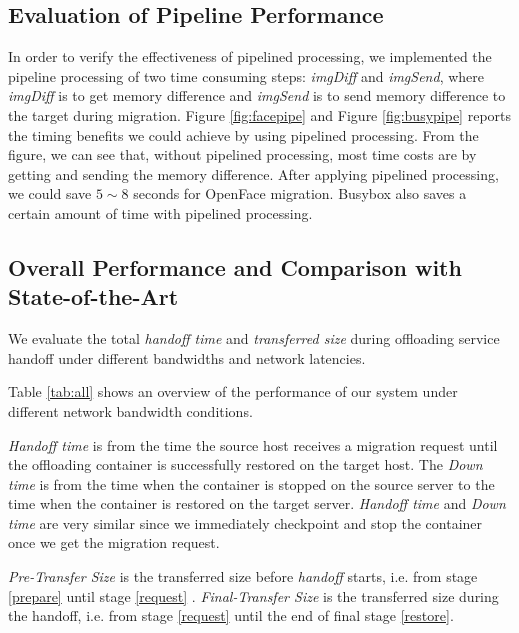 \subsection{Evaluation of Pipeline Performance}


In order to verify the effectiveness of pipelined processing, we implemented the pipeline processing of two time consuming steps: \textit{imgDiff} and \textit{imgSend}, where \textit{imgDiff} is to get memory difference and \textit{imgSend} is to send memory difference to the target during migration. 
Figure \ref{fig:facepipe} and Figure \ref{fig:busypipe} reports the timing benefits we could achieve by using pipelined processing. From the figure, we can see that, without pipelined processing, most time costs are by getting and sending the memory difference. After applying pipelined processing, we could save $5\sim 8$ seconds for OpenFace migration. Busybox also saves a certain amount of time with pipelined processing.


\subsection{Overall Performance and Comparison with State-of-the-Art}
We evaluate the total \textit{handoff time} and \textit{transferred size } during offloading service handoff under different bandwidths and network latencies. 

Table \ref{tab:all} shows an overview of the performance of our system under different network bandwidth conditions.
% 




\textit{Handoff time}
is from the time the source host receives a migration request until the offloading container is successfully restored on the target host. The \textit{Down time} is from the time when the container is stopped on the source server to the time when the container is restored on the target server. \textit{Handoff time} and \textit{Down time} are very similar since we immediately checkpoint and stop the container once we get the migration request. 

\textit{Pre-Transfer Size} is the transferred size before \textit{handoff} starts, i.e. from stage \ref{prepare} until stage \ref{request} . \textit{Final-Transfer Size} is the transferred size during the handoff, i.e. from stage \ref{request} until the end of final stage \ref{restore}.


